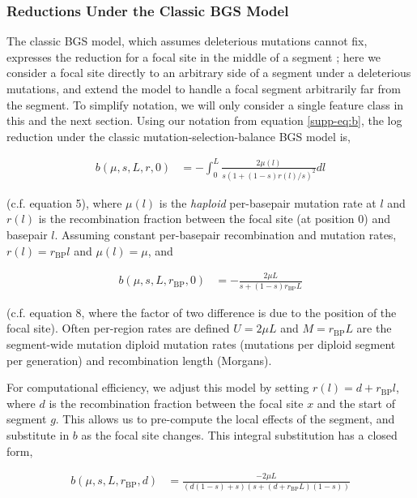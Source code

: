\documentclass[11pt]{article}
\begin{document}
\subsubsection{Reductions Under the Classic BGS Model}
\label{supp:reduction-classic}

The classic BGS model, which assumes deleterious mutations cannot fix,
expresses the reduction for a focal site in the middle of a segment
\parencite{Hudson1995-xc,Hudson1994-oh,Nordborg1996-nq}; here we consider a
focal site directly to an arbitrary side of a segment under a deleterious
mutations, and extend the model to handle a focal segment arbitrarily far from
the segment. To simplify notation, we will only consider a single feature class
in this and the next section. Using our notation from equation
\eqref{supp-eq:b}, the log reduction under the classic
mutation-selection-balance BGS model is,

\begin{align}
  b(\mu, s, L, r, 0) &=  - \int_0^L \frac{2\mu(l)}{s (1 + (1-s) r(l)/s)^2} dl 
\end{align}
 
(c.f. \cite{Hudson1995-xc} equation 5), where $\mu(l)$ is the \emph{haploid}
per-basepair mutation rate at $l$ and $r(l)$ is the recombination fraction
between the focal site (at position 0) and basepair $l$. Assuming constant
per-basepair recombination and mutation rates, $r(l) = r_\text{BP}l$ and
$\mu(l) = \mu$, and

\begin{align}
  b(\mu, s, L, r_\text{BP}, 0) &= - \frac{2\mu L}{s + (1-s) r_\text{BP} L} 
\end{align}

(c.f. \cite{Hudson1995-xc} equation 8, where the factor of two difference is
due to the position of the focal site). Often per-region rates are defined $U =
2 \mu L$ and $M = r_\text{BP} L$ are the segment-wide mutation diploid mutation
rates (mutations per diploid segment per generation) and recombination length
(Morgans). 

For computational efficiency, we adjust this model by setting $r(l) = d +
r_\text{BP} l$, where $d$ is the recombination fraction between the focal site
$x$ and the start of segment $g$. This allows us to pre-compute the local
effects of the segment, and substitute in $b$ as the focal site changes. This
integral substitution has a closed form,

\begin{align}
  b(\mu, s, L, r_\text{BP}, d) &= \frac{-2\mu L}{(d(1-s) + s)(s + (d + r_\text{BP}L)(1-s))}
\end{align}
\end{document}

